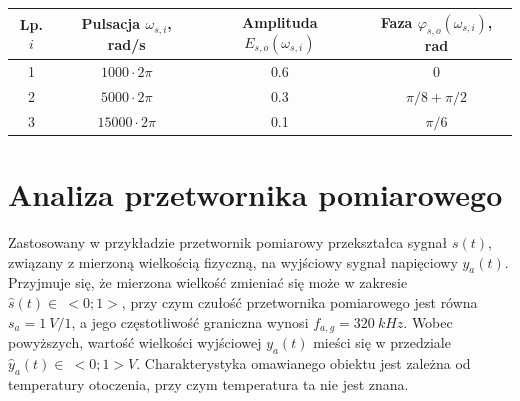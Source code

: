 \begin{table}[htb!]
\begin{center}
\begin{tabular}[c]{| c | c | c | c |} \hline
\textbf{Lp. $i$} & \textbf{Pulsacja $\omega_{s,i}$, rad/s} & \textbf{Amplituda $E_{s,o}(\omega_{s,i})$} & \textbf{Faza $\varphi_{s,o}(\omega_{s,i})$, rad} \\ \hline
1 & $1000  \cdot 2\pi$ &  0.6 & $0$                 \\ \hline
2 & $5000  \cdot 2\pi$ &  0.3 & $\pi / 8 + \pi / 2$ \\ \hline
3 & $15000 \cdot 2\pi$ &  0.1 & $\pi / 6$           \\ \hline
\end{tabular}
\end{center}
\end{table}

\section{Analiza przetwornika pomiarowego}

Zastosowany w przykładzie przetwornik pomiarowy przekształca sygnał $s(t)$, związany z mierzoną wielkością fizyczną, na wyjściowy sygnał napięciowy $y_{a}(t)$. Przyjmuje się, że mierzona wielkość zmieniać się może w zakresie $\hat{s}(t) \in~<0;1>$, przy czym czułość przetwornika pomiarowego jest równa $s_{a} = \qty{1}{V \per 1}$, a jego częstotliwość graniczna wynosi $f_{a,g} = \qty{320}{kHz}$. Wobec powyższych, wartość wielkości wyjściowej $y_{a}(t)$ mieści się w przedziale $\hat{y}_{a}(t) \in~<0;1>\unit{V}$. Charakterystyka omawianego obiektu jest zależna od temperatury otoczenia, przy czym temperatura ta nie jest znana.

